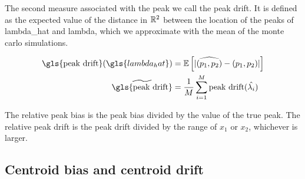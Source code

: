 The second measure associated with the peak we call the \gls{peak drift}.
It is defined as the expected value of the distance in $\mathbb{R}^2$ between the location of the peaks of \gls{lambda_hat} and \gls{lambda}, which we approximate with the mean of the monte carlo simulations.

\begin{align}
    \mbox{\gls{peak drift}}(\gls{lambda_hat}) & = \E \left[%
                            |\widehat{(p_1, p_2)} - (p_1, p_2)|%
                        \right] \\%
    \widetilde{\mbox{\gls{peak drift}}}
        & = \frac{1}{M} \sum_{i=1}^{M} \mbox{peak drift}(\hat{\lambda_i})%
\end{align}

The \gls{relative peak bias} is the \gls{peak bias} divided by the value of the true peak.
The \gls{relative peak drift} is the \gls{peak drift} divided by the range of $x_1$ or $x_2$, whichever is larger.

\subsection{Centroid bias and centroid drift}
\label{subsec:method:centroid_bias}

